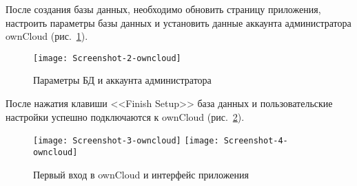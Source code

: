 После создания базы данных, необходимо обновить страницу приложения, настроить параметры базы данных и установить данные аккаунта администратора ownCloud (рис.~\ref{pic:db-own}).

\begin{figure}[ht]
    \centering
	\texttt{[image: Screenshot-2-owncloud]}
	\caption{Параметры БД и аккаунта администратора}\label{pic:db-own}
\end{figure}

После нажатия клавиши <<Finish Setup>> база данных и пользовательские настройки успешно подключаются к ownCloud (рис.~\ref{pic:interface-own}).

\begin{figure}[ht]
    \centering
	\texttt{[image: Screenshot-3-owncloud]}
	\texttt{[image: Screenshot-4-owncloud]}
	\caption{Первый вход в ownCloud и интерфейс приложения}\label{pic:interface-own}
\end{figure}

\clearpage
